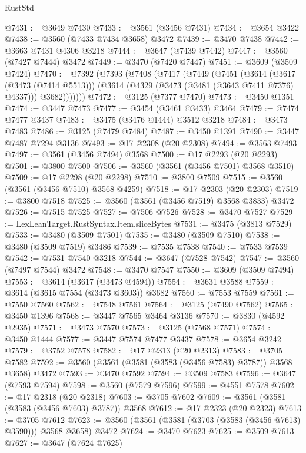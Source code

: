 \begin{lexlean}{RustStd}
\begin{coremodule}
@7431 := @3649 @7430
@7433 := @3561 (@3456 @7431)
@7434 := @3654 @3422
@7438 := @3560 (@7433 @7434 @3658) @3472
@7439 := @3470 @7438
@7442 := @3663 @7431 @4306 @3218
@7444 := @3647 (@7439 @7442)
@7447 := @3560 (@7427 @7444) @3472
@7449 := @3470 (@7420 @7447)
@7451 := @3609 (@3509 @7424)
@7470 := @7392
    (@7393
      (@7408
        (@7417
          (@7449
            (@7451
              (@3614
                (@3617 (@3473 (@7414 @5513)))
                (@3614 (@4329 (@3473 (@3481 (@3643 @7411 @7376) @4337))) @3682)))))))
@7472 := @3125 (@7377 @7470)
@7473 := @3450 @1351
@7474 := @3447 @7473
@7477 := @3454 (@3461 @3433) @3464
@7479 := @7474 @7477 @3437
@7483 := @3475 (@3476 @1444) @3512 @3218
@7484 := @3473 @7483
@7486 := @3125 (@7479 @7484)
@7487 := @3450 @1391
@7490 := @3447 @7487 @7294 @3136
@7493 := @17 @2308 (@20 @2308)
@7494 := @3563 @7493
@7497 := @3561 (@3456 @7494) @3568
@7500 := @17 @2293 (@20 @2293)
@7501 := @3800 @7500
@7506 := @3560 (@3561 (@3456 @7501) @3568 @3510)
@7509 := @17 @2298 (@20 @2298)
@7510 := @3800 @7509
@7515 := @3560 (@3561 (@3456 @7510) @3568 @4259)
@7518 := @17 @2303 (@20 @2303)
@7519 := @3800 @7518
@7525 := @3560 (@3561 (@3456 @7519) @3568 @3833) @3472
@7526 := @7515 @7525
@7527 := @7506 @7526
@7528 := @3470 @7527
@7529 := LexLeanTarget.RustSyntax.Item.sliceBytes
@7531 := @3475 (@3813 @7529)
@7533 := @3480 (@3509 @7501)
@7535 := @3480 (@3509 @7510)
@7538 := @3480 (@3509 @7519) @3486
@7539 := @7535 @7538
@7540 := @7533 @7539
@7542 := @7531 @7540 @3218
@7544 := @3647 (@7528 @7542)
@7547 := @3560 (@7497 @7544) @3472
@7548 := @3470 @7547
@7550 := @3609 (@3509 @7494)
@7553 := @3614 (@3617 (@3473 @4594))
@7554 := @3631 @3588
@7559 := @3614 (@3615 @7554 (@3473 @3603)) @3682
@7560 := @7553 @7559
@7561 := @7550 @7560
@7562 := @7548 @7561
@7564 := @3125 (@7490 @7562)
@7565 := @3450 @1396
@7568 := @3447 @7565 @3464 @3136
@7570 := @3830 (@4592 @2935)
@7571 := @3473 @7570
@7573 := @3125 (@7568 @7571)
@7574 := @3450 @1444
@7577 := @3447 @7574 @7477 @3437
@7578 := @3654 @3242
@7579 := @3752 @7578
@7582 := @17 @2313 (@20 @2313)
@7583 := @3705 @7582
@7592 := @3560 (@3561 (@3581 (@3583 (@3456 @7583) @3787)) @3568 @3658) @3472
@7593 := @3470 @7592
@7594 := @3509 @7583
@7596 := @3647 (@7593 @7594)
@7598 := @3560 (@7579 @7596)
@7599 := @4551 @7578
@7602 := @17 @2318 (@20 @2318)
@7603 := @3705 @7602
@7609 := @3561 (@3581 (@3583 (@3456 @7603) @3787)) @3568
@7612 := @17 @2323 (@20 @2323)
@7613 := @3705 @7612
@7623 := @3560 (@3561 (@3581 (@3703 (@3583 (@3456 @7613) @3590))) @3568 @3658) @3472
@7624 := @3470 @7623
@7625 := @3509 @7613
@7627 := @3647 (@7624 @7625)

\end{coremodule}
\end{lexlean}

